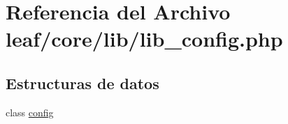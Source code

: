 \hypertarget{lib__config_8php}{\section{Referencia del Archivo leaf/core/lib/lib\-\_\-config.php}
\label{lib__config_8php}
}
\subsection*{Estructuras de datos}
\begin{DoxyCompactItemize}
\item 
class \hyperlink{classconfig}{config}
\end{DoxyCompactItemize}
